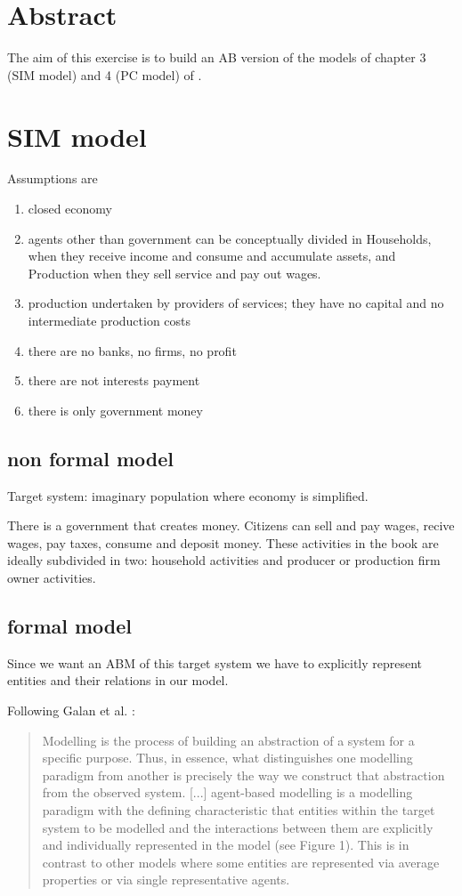 \documentclass[10pt,a4paper]{article}
\author{Marcello Nieddu}
\begin{document}
\section{Abstract}
The aim of this exercise is to build an AB version of the models of chapter 3 (SIM model) and 4 (PC model) of \cite{godley2006monetary}.

\section{SIM model}
Assumptions are
\begin{enumerate}
\item closed economy
\item agents other than government can be conceptually divided in Households, when they receive income and consume and accumulate assets, and Production when they sell service and pay out wages.
\item production undertaken by providers of services; they have no capital and no intermediate production costs
\item there are no banks, no firms, no profit
\item there are not interests payment
\item there is only government money
\end{enumerate}
\subsection{non formal model}
Target system: imaginary population where economy is simplified.

There is a government that creates money. Citizens can sell and pay wages, recive wages, pay taxes, consume and deposit money. These activities in the book are ideally subdivided in two: household activities and producer or production firm owner activities.



\subsection{formal model}
Since we  want an ABM of this target system we have to explicitly represent entities and their relations in our model.

Following Galan et al. \cite{galan2009errors}:

\begin{quote}
Modelling is the process of building an abstraction of a system for a specific purpose. Thus, in essence, what distinguishes one modelling paradigm from another is precisely the way we construct that abstraction from the observed system. [...] agent-based modelling is a modelling paradigm with the defining characteristic that entities within the target system to be modelled and the interactions between them are explicitly and individually represented in the model (see Figure 1). This is in contrast to other models where some entities are represented via average properties or via single representative agents.
\end{quote}
\end{document}
